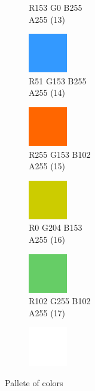 \begin{figure}[!h]
\begin{subfigure}{0.105\textwidth}
		\vspace*{-20px} \caption*{\hspace*{-0.25px}\tiny R153 G0 B255 \\ \tiny A255 (13)}
	\end{subfigure}
	 \begin{subfigure}{0.105\textwidth}\centering
		\includegraphics[frame]{gui-imgs/R51G153B255A255}
		\vspace*{-20px} \caption*{\hspace*{-0.25px}\tiny R51 G153 B255 \\ \tiny A255 (14)}
	\end{subfigure}
	\begin{subfigure}{0.105\textwidth}\centering
		\includegraphics[frame]{gui-imgs/R255G02B0A255}
		\vspace*{-20px} \caption*{\hspace*{-0.25px}\tiny R255 G153 B102 \\ \tiny A255 (15)}
	\end{subfigure}
	\begin{subfigure}{0.105\textwidth}\centering
		\includegraphics[frame]{gui-imgs/R204G204B0A255}
		\vspace*{-20px} \caption*{\hspace*{-0.25px}\tiny R0 G204 B153 \\ \tiny A255 (16)}
	\end{subfigure}
	\begin{subfigure}{0.105\textwidth}\centering
		\includegraphics[frame]{gui-imgs/R102G255B102A255}
		\vspace*{-20px} \caption*{\hspace*{-0.25px}\tiny R102 G255 B102 \\ \tiny A255 (17)}
	\end{subfigure}
	\begin{subfigure}{0.105\textwidth}\centering
		\includegraphics{gui-imgs/R255G255B255A255}
	\end{subfigure}
	\caption{Pallete of colors}
\end{figure}

